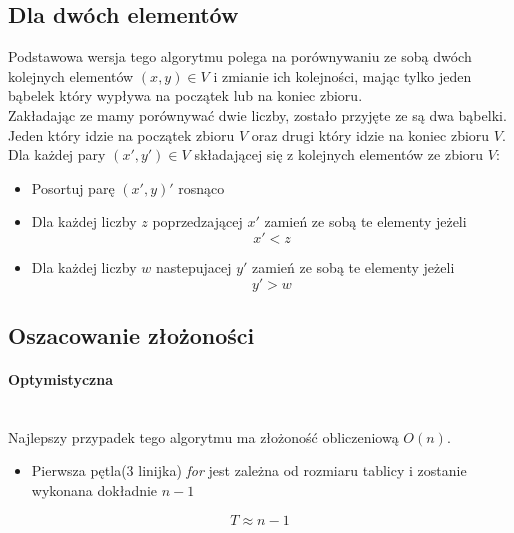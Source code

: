 \subsection{Dla dwóch elementów}
Podstawowa wersja tego algorytmu polega na porównywaniu ze sobą dwóch kolejnych elementów $(x,y) \in V$ i zmianie ich kolejności, mając tylko jeden bąbelek który wypływa na początek lub na koniec zbioru. \\
Zakładając ze mamy porównywać dwie liczby, zostało przyjęte ze są dwa bąbelki. Jeden który idzie na początek zbioru  $V$ oraz drugi który idzie na koniec zbioru $V$. \\
Dla każdej pary $(x',y') \in V$ składającej się z kolejnych elementów ze zbioru $V$:
\begin{itemize} 
\item Posortuj parę $(x',y)'$ rosnąco
\item Dla każdej liczby $z$ poprzedzającej $x'$ zamień ze sobą te elementy jeżeli \begin{equation*}x' < z\end{equation*} 
\item  Dla każdej liczby $w$ nastepujacej $y'$ zamień ze sobą te elementy jeżeli  \begin{equation*}y'>w\end{equation*}
 \end{itemize}  


 \subsection{Oszacowanie złożoności}

\paragraph{Optymistyczna}\mbox{}\\
Najlepszy przypadek tego algorytmu ma złożoność obliczeniową $O(n)$. 
\begin{itemize}
\item Pierwsza pętla(3 linijka) \textit{for} jest zależna od rozmiaru tablicy i zostanie wykonana dokładnie $n-1$
\end{itemize}

\begin{equation*}
T \approx n -1
\end{equation*}
\wyjT
